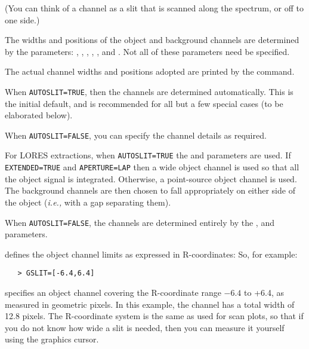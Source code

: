(You can think of a channel as a slit that is scanned along the spectrum,
or off to one side.\@)

The widths and positions of the object and background channels are determined
by the parameters: ,
, ,
, ,
 and \@.  Not
all of these parameters need be specified.

The actual channel widths and positions adopted are printed by the
 command.

When \verb+AUTOSLIT=TRUE+, then the channels are determined
automatically.  This is the initial default, and is recommended for all but
a few special cases (to be elaborated below)\@.

When \verb+AUTOSLIT=FALSE+, you can specify the channel details as required.

For LORES extractions, when \verb+AUTOSLIT=TRUE+ the
 and 
parameters are used.  If \verb+EXTENDED=TRUE+ and \verb+APERTURE=LAP+ then a
wide object channel is used so that all the object signal is integrated.
Otherwise, a point-source object channel is used.  The background channels are
then chosen to fall appropriately on either side of the object ({\it{i.e.,}}
with a gap separating them)\@.

When \verb+AUTOSLIT=FALSE+, the channels are determined entirely by the
,  and
 parameters.

 defines the object channel limits as expressed in
R-coordinates: So, for example:

\begin{verbatim}
   > GSLIT=[-6.4,6.4]
\end{verbatim}

\begin{latexonly}
specifies an object channel covering the R-coordinate range $-6.4$ to +6.4,
as measured in geometric pixels.  In this example, the channel has a total
width of 12.8 pixels.  The R-coordinate system is the same as used for
scan plots, so that if you do not know how wide a slit is needed, then you can
measure it yourself using the graphics cursor.
\end{latexonly}

